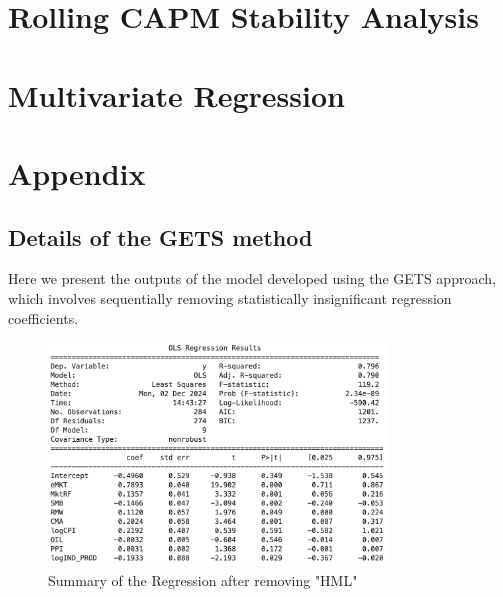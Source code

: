 \documentclass[12pt, openright, oneside]{report}
\begin{document}
\chapter{Rolling CAPM Stability Analysis}\label{chapter:rolling}


\chapter{Multivariate Regression}\label{chapter:multivariate}


\chapter*{Appendix}\label{chapter:appendix}


\section*{Details of the GETS method}\label{section:GETS}

Here we present the outputs of the model developed using the GETS approach, which involves sequentially removing
statistically insignificant regression coefficients.

\begin{figure}[h!]
    \centering
    \includegraphics[width=0.8\textwidth]{images/HML1.png}
    \caption{Summary of the Regression after removing "HML"}\label{fig:HML1}
\end{figure} 
\end{document}
